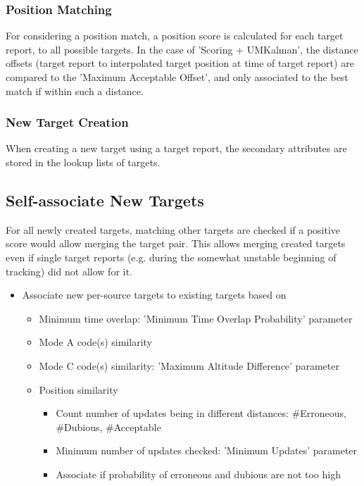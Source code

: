 \begin{itemize}
\subsubsection{Position Matching}

For considering a position match, a position score is calculated for each target report, to all possible targets. In the case of 'Scoring + UMKalman', the distance offsets (target report to interpolated target position at time of target report) are compared to the 'Maximum Acceptable Offset', and only associated to the best match if within such a distance.

\subsubsection{New Target Creation}

When creating a new target using a target report, the secondary attributes are stored in the lookup lists of targets.

\subsection{Self-associate New Targets}

For all newly created targets, matching other targets are checked if a positive score would allow merging the target pair. This allows merging created targets even if single target reports (e.g. during the somewhat unstable beginning of tracking) did not allow for it.

\begin{itemize}
\item Associate new per-source targets to existing targets based on
\begin{itemize}
\item Minimum time overlap: 'Minimum Time Overlap Probability' parameter
\item Mode A code(s) similarity
\item Mode C code(s) similarity: 'Maximum Altitude Difference' parameter
\item Position similarity
\begin{itemize}
\item Count number of updates being in different distances: \#Erroneous, \#Dubious, \#Acceptable
\item Minimum number of updates checked: 'Minimum Updates' parameter
\item Associate if probability of erroneous and dubious are not too high
\end{itemize}
\end{itemize}
\end{itemize}
\ \\


\end{itemize}
